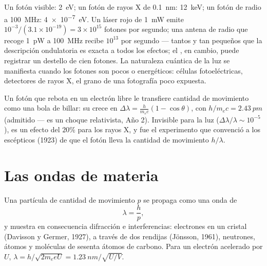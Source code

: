 \begin{example}\label{ex:b1:quantum-introduction:orders}
Un fotón visible: \qty{2}{eV}; un fotón de rayos X de \qty{0.1}{nm}: \qty{12}{keV};
un fotón de radio a \qty{100}{MHz}: \qty{4e-7}{eV}. Un láser rojo de \qty{1}{mW}
emite $10^{-3}/(3.1 \times 10^{-19}) = 3 \times 10^{15}$ fotones por segundo;
una antena de radio que recoge \qty{1}{pW} a \qty{100}{MHz} recibe $10^{13}$
por segundo --- tantos y tan pequeños que la descripción ondulatoria es
exacta a todos los efectos; el , en cambio, puede registrar un
destello de cien fotones. La naturaleza cuántica de la luz se manifiesta
cuando los fotones son pocos o energéticos: células fotoeléctricas,
detectores de rayos X, el grano de una fotografía poco expuesta.
\end{example}

\begin{remark}\label{rem:b1:quantum-introduction:compton}
Un fotón que rebota en un electrón libre le transfiere cantidad de
movimiento como una bola de billar: su  crece en
$\Delta\lambda = \frac{h}{m_ec}(1 -
\cos\theta)$, con $h/m_ec = \qty{2.43}{pm}$ (admitido --- es un choque
relativista, Año 2). Invisible para la luz ($\Delta\lambda/\lambda \sim 10^{-5}$),
es un efecto del $20\%$ para los rayos X, y fue el experimento que
convenció a los escépticos (1923) de que el fotón lleva la cantidad de
movimiento $h/\lambda$.
\end{remark}

\section{Las ondas de materia}

\begin{theorem}[De Broglie]\label{thm:b1:quantum-introduction:debroglie}
Una partícula de cantidad de movimiento $p$ se propaga como una onda de
\[
\lambda = \frac{h}{p} ,
\]
y muestra en consecuencia difracción e interferencias: electrones en un
cristal (Davisson y Germer, 1927), a través de dos rendijas (Jönsson,
1961), neutrones, átomos y moléculas de sesenta átomos de carbono. Para
un electrón acelerado por $U$, $\lambda = h/\sqrt{2m_eeU} = \qty{1.23}{nm}/\sqrt{U/\unit{V}}$.
\end{theorem}
\admitted

